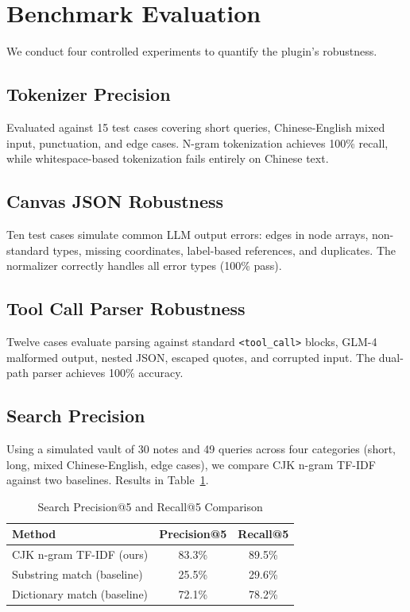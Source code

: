 \documentclass[10pt,a4paper]{article}
\begin{document}
\section{Benchmark Evaluation}

We conduct four controlled experiments to quantify the plugin's robustness.

\subsection{Tokenizer Precision}

Evaluated against 15 test cases covering short queries, Chinese-English mixed input, punctuation, and edge cases. N-gram tokenization achieves 100\% recall, while whitespace-based tokenization fails entirely on Chinese text.

\subsection{Canvas JSON Robustness}

Ten test cases simulate common LLM output errors: edges in node arrays, non-standard types, missing coordinates, label-based references, and duplicates. The normalizer correctly handles all error types (100\% pass).

\subsection{Tool Call Parser Robustness}

Twelve cases evaluate parsing against standard \texttt{<tool\_call>} blocks, GLM-4 malformed output, nested JSON, escaped quotes, and corrupted input. The dual-path parser achieves 100\% accuracy.

\subsection{Search Precision}

Using a simulated vault of 30 notes and 49 queries across four categories (short, long, mixed Chinese-English, edge cases), we compare CJK n-gram TF-IDF against two baselines. Results in Table~\ref{tab:search}.

\begin{table}[H]
\centering
\caption{Search Precision@5 and Recall@5 Comparison}
\label{tab:search}
\begin{tabular}{lcc}
\toprule
\textbf{Method} & \textbf{Precision@5} & \textbf{Recall@5} \\
\midrule
CJK n-gram TF-IDF (ours) & 83.3\% & 89.5\% \\
Substring match (baseline) & 25.5\% & 29.6\% \\
Dictionary match (baseline) & 72.1\% & 78.2\% \\
\bottomrule
\end{tabular}
\end{table}
\end{document}
